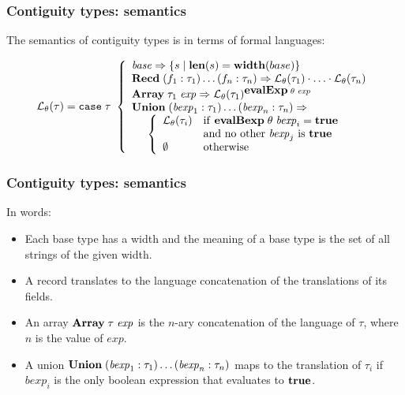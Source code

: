 \documentclass{beamer}
\newcommand{\konst}[1]{\ensuremath{\mbox{\bf{#1}}}}
\newcommand{\set}[1]{\{ {#1} \}}
\newcommand{\LangTheta}[1]{\ensuremath{{\mathcal L}_{\theta}({#1})}}
\begin{document}
\begin{frame}[fragile]\frametitle{Contiguity types: semantics}

The semantics of contiguity types is in terms of formal languages:

\[
\LangTheta{\tau} =
\mathtt{case}\; \tau\
 \left\{
 \begin{array}{l}
 \mathit{base} \Rightarrow \set{s \mid \konst{len}(s) = \konst{width}(base)} \\
 \konst{Recd}\; (f_1 : \tau_1) \ldots (f_n : \tau_n)
      \Rightarrow \LangTheta{\tau_1} \cdot \ldots \cdot \LangTheta{\tau_n}
\\
 \konst{Array}\; \tau_1 \; \mathit{exp}
      \Rightarrow  \LangTheta{\tau_1}^{\konst{evalExp}\;\theta\;\mathit{exp}}
\\
 \konst{Union}\; (\mathit{bexp}_1 : \tau_1) \ldots (\mathit{bexp}_n : \tau_n) \Rightarrow \\
  \hspace*{5mm}
 \left\{
 \begin{array}{ll}
    \LangTheta{\tau_i} &  \mathrm{if}\ \konst{evalBexp}\;\theta\;\mathit{bexp}_i = \konst{true} \\
                  & \mathrm{and\ no\ other}\ \mathit{bexp}_j\ \mathrm{is}\ \konst{true}  \\
    \emptyset & \mathrm{otherwise}
 \end{array}
 \right.
 \\
\end{array}
 \right.
\]
\end{frame}

\begin{frame}[fragile]\frametitle{Contiguity types: semantics}

In words:

\begin{itemize}
\item Each base type has a width and the meaning of a base type is the
  set of all strings of the given width.

\item A record translates to the language concatenation of the translations of its fields.

\item An array $\konst{Array}\;\tau\; \mathit{exp}$ is the $n$-ary
  concatenation of the language of $\tau$, where $n$ is the value of
  $\mathit{exp}$.

\item A union $\konst{Union}\; (\mathit{bexp}_1 : \tau_1) \ldots
  (\mathit{bexp}_n : \tau_n)$ maps to the translation of $\tau_i$ if
  $\mathit{bexp}_i$ is the only boolean expression that evaluates to
  \konst{true}.

\end{itemize}

\end{frame}
\end{document}
